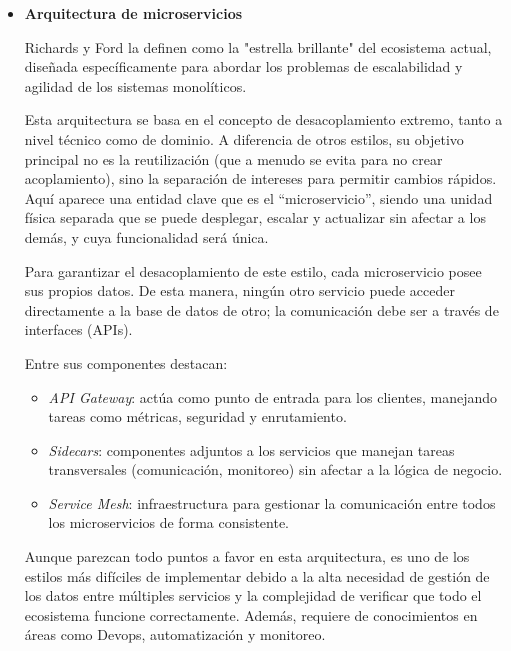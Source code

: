 \begin{itemize}
    Como conclusión, su uso es recomendado en aplicaciones que necesitan reaccionar en tiempo real a grandes flujos de información, 
    como en sistemas de procesamiento de datos de telemetría.

    \item \textbf{Arquitectura de microservicios}
    \newline

    Richards y Ford la definen como la "estrella brillante" del ecosistema actual, diseñada específicamente para abordar los problemas 
    de escalabilidad y agilidad de los sistemas monolíticos.

    Esta arquitectura se basa en el concepto de desacoplamiento extremo, tanto a nivel técnico como de dominio. A diferencia de otros 
    estilos, su objetivo principal no es la reutilización (que a menudo se evita para no crear acoplamiento), sino la separación de 
    intereses para permitir cambios rápidos. Aquí aparece una entidad clave que es el ``microservicio'', siendo una unidad física 
    separada que se puede desplegar, escalar y actualizar sin afectar a los demás, y cuya funcionalidad será única.

    Para garantizar el desacoplamiento de este estilo, cada microservicio posee sus propios datos. De esta manera, ningún otro servicio 
    puede acceder directamente a la base de datos de otro; la comunicación debe ser a través de interfaces (APIs).

    Entre sus componentes destacan:

    \begin{itemize}
        \item \textit{API Gateway}: actúa como punto de entrada para los clientes, manejando tareas como métricas, seguridad y enrutamiento.
        \item \textit{Sidecars}: componentes adjuntos a los servicios que manejan tareas transversales (comunicación, monitoreo) sin 
        afectar a la lógica de negocio.
        \item \textit{Service Mesh}: infraestructura para gestionar la comunicación entre todos los microservicios de forma consistente.
    \end{itemize}

    Aunque parezcan todo puntos a favor en esta arquitectura, es uno de los estilos más difíciles de implementar debido a la alta necesidad
    de gestión de los datos entre múltiples servicios y la complejidad de verificar que todo el ecosistema funcione correctamente. Además,
    requiere de conocimientos en áreas como Devops, automatización y monitoreo.


\end{itemize}
